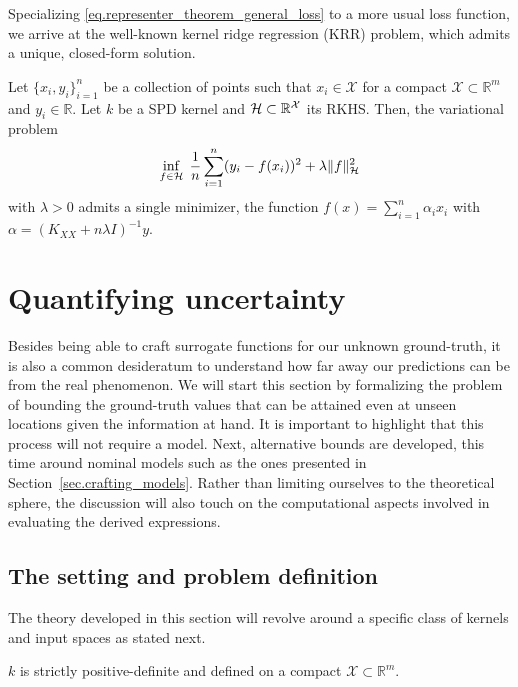 Specializing \eqref{eq.representer_theorem_general_loss} to a more usual loss function, we arrive at the well-known kernel ridge regression (KRR) problem, which admits a unique, closed-form solution.

\begin{corollary}
	Let $\{x_i,y_i\}_{i=1}^n$ be a collection of points such that $x_i \in \mathcal{X}$ for a compact $\mathcal{X} \subset \mathbb{R}^m$ and $y_i \in \mathbb{R}$. Let $k$ be a SPD kernel and $\mathcal{H} \subset \mathbb{R}^\mathcal{X}$ its RKHS. Then, the variational problem
	\begin{equation}
		\inf_{f\in \mathcal{H}} \; \frac{1}{n} \sum_{i=1}^n (y_i - f(x_i))^2 + \lambda \Vert f \Vert_{\mathcal{H}}^2
	\end{equation}
	with $\lambda > 0$ admits a single minimizer, the function $f(x) = \sum_{i=1}^n \alpha_i x_i$ with $\alpha = (K_{XX} + n \lambda I)^{-1} y$. 
\end{corollary}


\section{Quantifying uncertainty}

Besides being able to craft surrogate functions for our unknown ground-truth, it is also a common desideratum to understand how far away our predictions can be from the real phenomenon. We will start this section by formalizing the problem of bounding the ground-truth values that can be attained even at unseen locations given the information at hand. It is important to highlight that this process will not require a model. Next, alternative bounds are developed, this time around nominal models such as the ones presented in Section~\ref{sec.crafting_models}. Rather than limiting ourselves to the theoretical sphere, the discussion will also touch on the computational aspects involved in evaluating the derived expressions.

\subsection{The setting and problem definition}

The theory developed in this section will revolve around a specific class of kernels and input spaces as stated next.

\begin{assumption}
	\label{as:kernel_spd_compact_X}
	 $k$ is strictly positive-definite and defined on a compact $\mathcal{X} \subset \mathbb{R}^m$.
\end{assumption}

